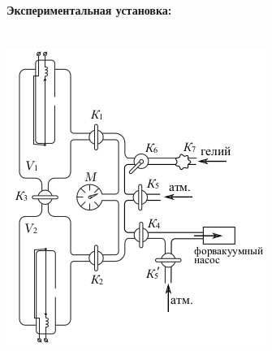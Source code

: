 \documentclass[12pt,a4paper]{article}
\begin{document}
	\paragraph{Экспериментальная установка:} ~\\
	\includegraphics[scale=1.5]{Workplace.png}
	
\end{document}
